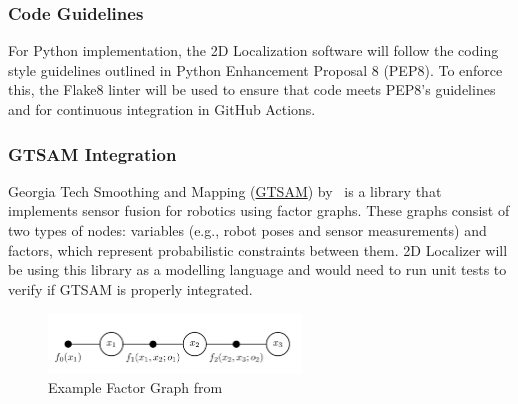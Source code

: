 \documentclass[12pt, titlepage]{article}
\begin{document}
\subsubsection{Code Guidelines}
For Python implementation, the 2D Localization software will follow the coding style guidelines outlined in Python Enhancement Proposal 8 (PEP8). To enforce this, the Flake8 linter will be used to ensure that code meets PEP8's guidelines and for continuous integration in GitHub Actions.

\subsubsection{GTSAM Integration}
Georgia Tech Smoothing and Mapping (\href{https://github.com/borglab/gtsam}{GTSAM}) by~\cite{gtsam2022} is a library that implements sensor fusion for robotics using factor graphs. These graphs consist of two types of nodes: variables (e.g., robot poses and sensor measurements) and factors, which represent probabilistic constraints between them. 2D Localizer will be using this library as a modelling language and would need to run unit tests to verify if GTSAM is properly integrated.

\begin{figure}[h!]
  \begin{center}
    \includegraphics[width=0.6\textwidth]{factor_graph.png}
    \caption{Example Factor Graph from \cite{Dellaert2012}}
    \label{fig_factor} 
  \end{center}
\end{figure}


\end{document}
